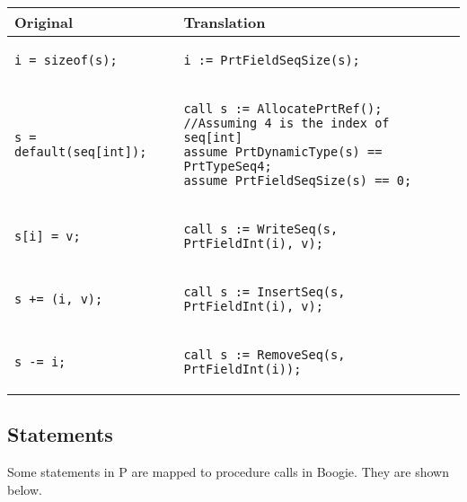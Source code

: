 \documentclass{llncs}
\providecommand{\tabularnewline}{\\}
\begin{document}
\begin{center}
\begin{tabular}{|p{}|p{}|}
\hline
\textbf{Original} & \textbf{Translation}
\tabularnewline
\hline
\hline
\begin{verbatim}
i = sizeof(s);
\end{verbatim}
&
\begin{verbatim}
i := PrtFieldSeqSize(s);
\end{verbatim}
\tabularnewline
\hline

\begin{verbatim}
s = default(seq[int]);
\end{verbatim}
&
\begin{verbatim}
call s := AllocatePrtRef();
//Assuming 4 is the index of seq[int]
assume PrtDynamicType(s) == PrtTypeSeq4;
assume PrtFieldSeqSize(s) == 0;
\end{verbatim}
\tabularnewline
\hline

\begin{verbatim}
s[i] = v;
\end{verbatim}
&
\begin{verbatim}
call s := WriteSeq(s, PrtFieldInt(i), v);
\end{verbatim}

\tabularnewline
\hline
\begin{verbatim}
s += (i, v);
\end{verbatim}
&
\begin{verbatim}
call s := InsertSeq(s, PrtFieldInt(i), v);
\end{verbatim}
\tabularnewline
\hline

\begin{verbatim}
s -= i;
\end{verbatim}
&
\begin{verbatim}
call s := RemoveSeq(s, PrtFieldInt(i));
\end{verbatim}
\tabularnewline
\hline

\end{tabular}
\end{center}

\pagebreak

\subsection{Statements}
Some statements in P are mapped to procedure calls in Boogie. They are shown below.
\end{document}
